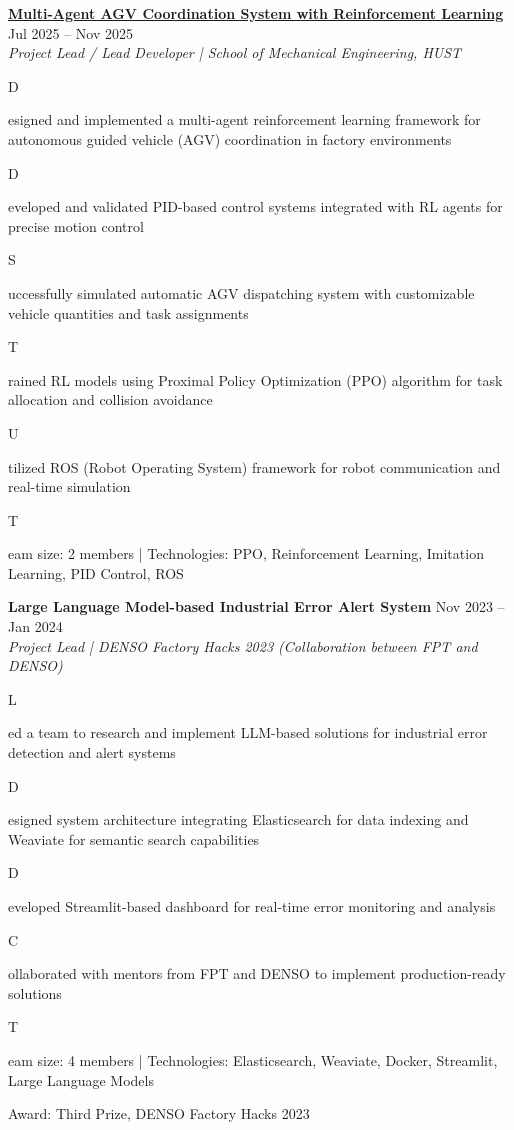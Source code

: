 \documentclass[11pt,letterpaper]{article}
\newcommand{\entry}[4]{
  \textbf{#1} \hfill #2 \\
  \textit{#3} \\
  #4
  \vspace{0.3em}
}
\newcommand{\item}[1]{
  \begin{itemize}[leftmargin=1.5em, topsep=0pt, itemsep=0.2em]
    #1
  \end{itemize}
}
\begin{document}
\entry
  {\href{https://andrewhaward2310.github.io/gnn-il-ppo-paper/}{Multi-Agent AGV Coordination System with Reinforcement Learning}}
  {Jul 2025 -- Nov 2025}
  {Project Lead / Lead Developer | School of Mechanical Engineering, HUST}
  {
    \begin{itemize}[leftmargin=1.5em, topsep=0pt, itemsep=0.2em]
      \item Designed and implemented a multi-agent reinforcement learning framework for autonomous guided vehicle (AGV) coordination in factory environments
      \item Developed and validated PID-based control systems integrated with RL agents for precise motion control
      \item Successfully simulated automatic AGV dispatching system with customizable vehicle quantities and task assignments
      \item Trained RL models using Proximal Policy Optimization (PPO) algorithm for task allocation and collision avoidance
      \item Utilized ROS (Robot Operating System) framework for robot communication and real-time simulation
      \item Team size: 2 members | Technologies: PPO, Reinforcement Learning, Imitation Learning, PID Control, ROS
    \end{itemize}
  }

\entry
  {Large Language Model-based Industrial Error Alert System}
  {Nov 2023 -- Jan 2024}
  {Project Lead | DENSO Factory Hacks 2023 (Collaboration between FPT and DENSO)}
  {
    \begin{itemize}[leftmargin=1.5em, topsep=0pt, itemsep=0.2em]
      \item Led a team to research and implement LLM-based solutions for industrial error detection and alert systems
      \item Designed system architecture integrating Elasticsearch for data indexing and Weaviate for semantic search capabilities
      \item Developed Streamlit-based dashboard for real-time error monitoring and analysis
      \item Collaborated with mentors from FPT and DENSO to implement production-ready solutions
      \item Team size: 4 members | Technologies: Elasticsearch, Weaviate, Docker, Streamlit, Large Language Models
      \item \textbf{Award:} Third Prize, DENSO Factory Hacks 2023
    \end{itemize}
  }
\end{document}
